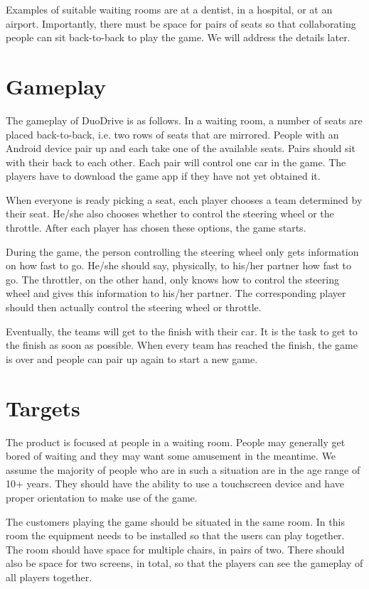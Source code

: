 \documentclass[11pt,twoside,a4paper]{article}
\begin{document}
Examples of suitable waiting rooms are at a dentist, in a hospital, or at an airport. Importantly, there must be space for pairs of seats so that collaborating people can sit back-to-back to play the game. We will address the details later.


\section{Gameplay}
The gameplay of DuoDrive is as follows. In a waiting room, a number of seats are placed back-to-back, i.e. two rows of seats that are mirrored. People with an Android device pair up and each take one of the available seats. Pairs should sit with their back to each other. Each pair will control one car in the game. The players have to download the game app if they have not yet obtained it.

When everyone is ready picking a seat, each player chooses a team determined by their seat. He/she also chooses whether to control the steering wheel or the throttle. After each player has chosen these options, the game starts.

During the game, the person controlling the steering wheel only gets information on how fast to go. He/she should say, physically, to his/her partner how fast to go. The throttler, on the other hand, only knows how to control the steering wheel and gives this information to his/her partner. The corresponding player should then actually control the steering wheel or throttle.

Eventually, the teams will get to the finish with their car. It is the task to get to the finish as soon as possible. When every team has reached the finish, the game is over and people can pair up again to start a new game.


\section{Targets}
The product is focused at people in a waiting room. People may generally get bored of waiting and they may want some amusement in the meantime. We assume the majority of people who are in such a situation are in the age range of 10+ years. They should have the ability to use a touchscreen device and have proper orientation to make use of the game.

The customers playing the game should be situated in the same room. In this room the equipment needs to be installed so that the users can play together. The room should have space for multiple chairs, in pairs of two. There should also be space for two screens, in total, so that the players can see the gameplay of all players together.
\end{document}
